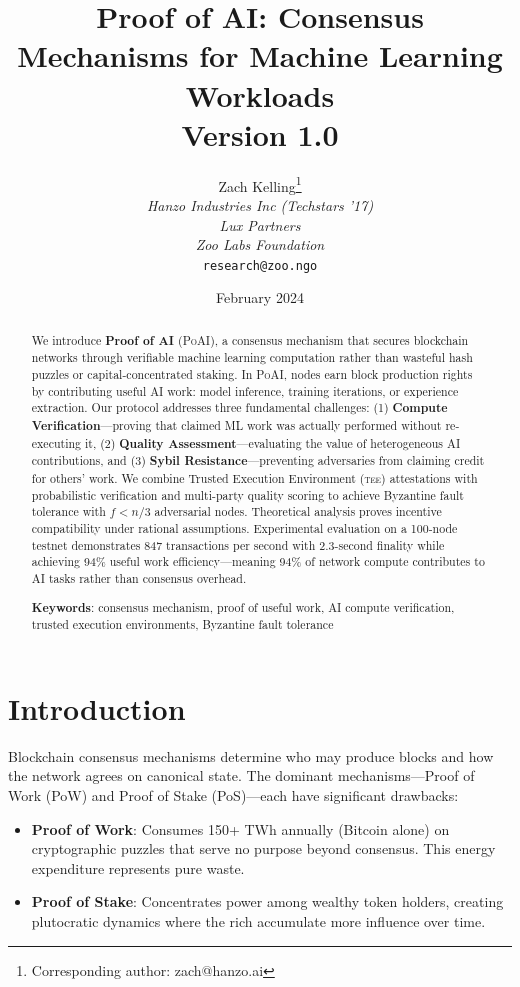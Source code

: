 \documentclass[11pt,letterpaper]{article}
\title{\textbf{Proof of AI: Consensus Mechanisms for Machine Learning Workloads}\\
\large Version 1.0}
\author{
Zach Kelling\thanks{Corresponding author: zach@hanzo.ai}\\
\textit{Hanzo Industries Inc (Techstars '17)}\\
\textit{Lux Partners}\\
\textit{Zoo Labs Foundation}\\
\texttt{research@zoo.ngo}
}
\date{February 2024}
\newcommand{\PoAI}{\textsc{PoAI}}
\newcommand{\TEE}{\textsc{tee}}
\begin{document}
\maketitle
\zoocover

\begin{abstract}
We introduce \textbf{Proof of AI} (\PoAI{}), a consensus mechanism that secures blockchain networks through verifiable machine learning computation rather than wasteful hash puzzles or capital-concentrated staking. In \PoAI{}, nodes earn block production rights by contributing useful AI work: model inference, training iterations, or experience extraction. Our protocol addresses three fundamental challenges: (1) \textbf{Compute Verification}---proving that claimed ML work was actually performed without re-executing it, (2) \textbf{Quality Assessment}---evaluating the value of heterogeneous AI contributions, and (3) \textbf{Sybil Resistance}---preventing adversaries from claiming credit for others' work. We combine Trusted Execution Environment (\TEE{}) attestations with probabilistic verification and multi-party quality scoring to achieve Byzantine fault tolerance with $f < n/3$ adversarial nodes. Theoretical analysis proves incentive compatibility under rational assumptions. Experimental evaluation on a 100-node testnet demonstrates 847 transactions per second with 2.3-second finality while achieving 94\% useful work efficiency---meaning 94\% of network compute contributes to AI tasks rather than consensus overhead.

\textbf{Keywords}: consensus mechanism, proof of useful work, AI compute verification, trusted execution environments, Byzantine fault tolerance
\end{abstract}

\section{Introduction}

Blockchain consensus mechanisms determine who may produce blocks and how the network agrees on canonical state. The dominant mechanisms---Proof of Work (PoW) and Proof of Stake (PoS)---each have significant drawbacks:

\begin{itemize}
    \item \textbf{Proof of Work}: Consumes 150+ TWh annually (Bitcoin alone) on cryptographic puzzles that serve no purpose beyond consensus. This energy expenditure represents pure waste.

    \item \textbf{Proof of Stake}: Concentrates power among wealthy token holders, creating plutocratic dynamics where the rich accumulate more influence over time.
\end{itemize}
\end{document}
